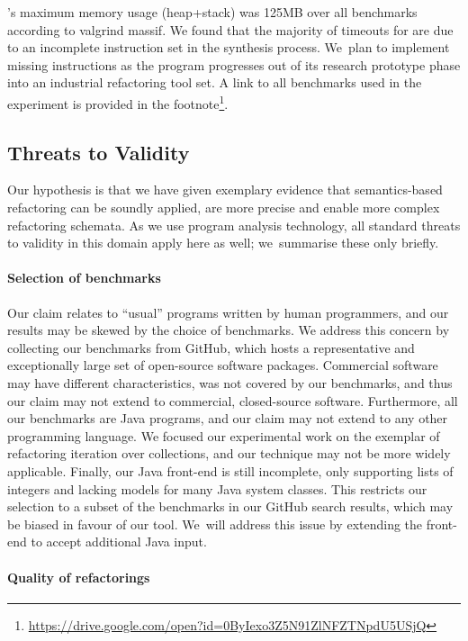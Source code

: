 \documentclass[runningheads,a4paper]{llncs}
\begin{document}
\tool's maximum memory usage (heap+stack) was 125MB over all benchmarks according to
valgrind massif.  We found that the majority of timeouts for \tool are due to an
incomplete instruction set in the synthesis process.  We~plan to implement missing
instructions as the program progresses out of its research prototype phase
into an industrial refactoring tool set.  A link to all benchmarks used in
the experiment is provided in the
footnote\footnote{\url{https://drive.google.com/open?id=0ByIexo3Z5N91ZlNFZTNpdU5USjQ}}.

\subsection{Threats to Validity}
\label{sec:threats.to.validity}

Our hypothesis is that we have given exemplary evidence that semantics-based
refactoring can be soundly applied, are more precise and enable more complex
refactoring schemata. As we use program analysis technology, all standard
threats to validity in this domain apply here as well; we~summarise these
only briefly.
%
\paragraph{Selection of benchmarks}
%
Our claim relates to ``usual'' programs written by human programmers, and
our results may be skewed by the choice of benchmarks.  We address this concern
by collecting our benchmarks from GitHub, which hosts a representative and
exceptionally large set of open-source software packages.  Commercial
software may have different characteristics, was not covered by our
benchmarks, and thus our claim may not extend to commercial, closed-source
software.  Furthermore, all our benchmarks are Java programs, and our claim
may not extend to any other programming language.  We focused
our experimental work on the exemplar of refactoring iteration over
collections, and our technique may not be more widely applicable.  Finally,
our Java front-end is still incomplete, only supporting lists of integers
and lacking models for many Java system classes.  This restricts our selection
to a subset of the benchmarks in our GitHub search results, which may be
biased in favour of our tool.  We~will address this issue by extending the
front-end to accept additional Java input.

\paragraph{Quality of refactorings}
\end{document}
